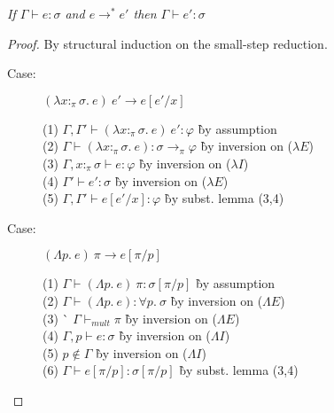 
\begin{theorem}
\emph{If $\Gamma \vdash e : \sigma$ and $e \to^* e'$ then $\Gamma \vdash e' : \sigma$}
\end{theorem}

\begin{proof}
By structural induction on the small-step reduction.

%

\begin{description}

\item[Case:] $(\lambda x{:}_\pi\sigma.~e)~e' \longrightarrow e[e'/x]$
\begin{tabbing}
  (1) $\Gamma, \Gamma' \vdash (\lambda x{:}_\pi\sigma.~e)~e' : \varphi$ \` by assumption \\
  (2) $\Gamma \vdash (\lambda x{:}_\pi\sigma.~e) : \sigma\to_\pi\varphi$ \` by inversion on ($\lambda E$) \\
  (3) $\Gamma, x{:}_\pi\sigma \vdash e : \varphi$ \` by inversion on ($\lambda I$) \\
  (4) $\Gamma' \vdash e' : \sigma$ \` by inversion on ($\lambda E$) \\
  (5) $\Gamma, \Gamma' \vdash e[e'/x] : \varphi$ \` by subst. lemma (3,4) \\
\end{tabbing}

\item[Case:] $(\Lambda p.~e)~\pi \longrightarrow e[\pi/p]$
\begin{tabbing}
(1) $\Gamma \vdash (\Lambda p.~e)~\pi : \sigma[\pi/p]$ \` by assumption \\
(2) $\Gamma \vdash (\Lambda p.~e) : \forall p.~\sigma$ \` by inversion on ($\Lambda E$) \\
(3) \` $\Gamma \vdash_{mult} \pi$ \` by inversion on ($\Lambda E$) \\
(4) $\Gamma, p \vdash e : \sigma$ \` by inversion on ($\Lambda I$) \\
(5) $p \notin \Gamma$ \` by inversion on ($\Lambda I$) \\
(6) $\Gamma \vdash e[\pi/p]:\sigma[\pi/p]$ \` by subst. lemma (3,4) \\
\end{tabbing}


\end{description}
\end{proof}
